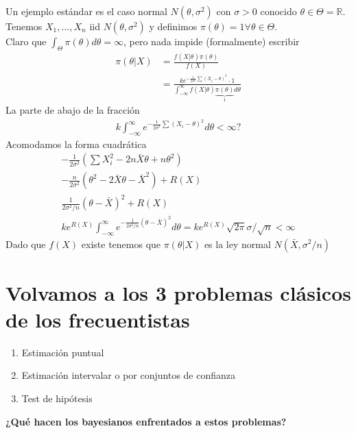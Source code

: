 \documentclass[10pt]{article}
\theoremstyle{plain}
\theoremstyle{definition}
\begin{document}
Un ejemplo estándar es el caso normal $N(\theta,\sigma^2)$ con $\sigma>0$ conocido $\theta \in \Theta = \mathbb{R}$. Tenemos $X_{1},\ldots,X_{n}$ iid $N(\theta,\sigma^2)$ y definimos $\pi(\theta)= 1  \forall \theta \in \Theta$.\\

Claro que $\int_{\Theta}\pi(\theta)d\theta = \infty$, pero nada impide (formalmente) escribir
\begin{align*}
\pi(\theta|X) &= \frac{f(X|\theta)\pi(\theta)}{f(X)}\\
&= \frac{ke^{-\frac{1}{2\sigma^2}\sum (X_{i}-\theta)^2}\cdot 1}{\int_{-\infty}^{\infty}f(X|\theta) \underbrace{\pi(\theta)}_{1}d\theta}
\end{align*}
La parte de abajo de la fracción
\begin{align*}
k\int_{-\infty}^{\infty}e^{-\frac{1}{2\sigma^2}\sum (X_{i}-\theta)^2}d\theta < \infty ?
\end{align*}
Acomodamos la forma cuadrática
\begin{align*}
-\frac{1}{2\sigma^2}\left(\sum X_{i}^2 - 2n\bar{X}\theta+ n \theta^2\right)\\
-\frac{n}{2\sigma^2}\left(\theta^2-2\bar{X}\theta-\bar{X}^2\right) + R(X)\\
\frac{1}{2\sigma^2/n}(\theta-\bar{X})^2 + R(X)\\
ke^{R(X)}\int_{-\infty}^{\infty}e^{-\frac{1}{2\sigma^2/n}(\theta-\bar{X})^2}d\theta = k e^{R(X)}\sqrt{2\pi}\sigma/\sqrt{n} < \infty
\end{align*}
Dado que $f(X)$ existe tenemos que $\pi(\theta|X)$ es la ley normal $N(\bar{X}, \sigma^2/n)$
\section{Volvamos a los 3 problemas clásicos de los frecuentistas}
\begin{enumerate}
\item Estimación puntual
\item Estimación intervalar o por conjuntos de confianza
\item Test de hipótesis
\end{enumerate}
\textbf{¿Qué hacen los bayesianos enfrentados a estos problemas?}\\
\end{document}
